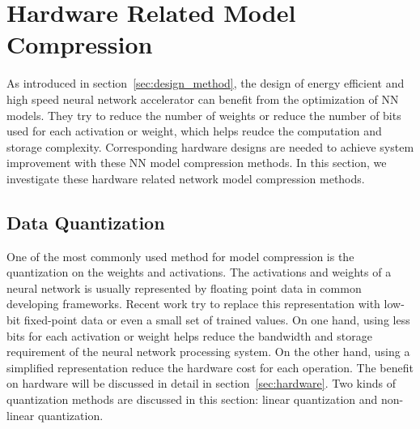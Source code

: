 \section{Hardware Related Model Compression}\label{sec:software}

As introduced in section~\ref{sec:design_method}, the design of energy efficient and high speed neural network accelerator can benefit from the optimization of NN models.  They try to reduce the number of weights or reduce the number of bits used for each activation or weight, which helps reudce the computation and storage complexity. Corresponding hardware designs are needed to achieve system improvement with these NN model compression methods. In this section, we investigate these hardware related network model compression methods.

\subsection{Data Quantization}\label{sec:software:quant}
One of the most commonly used method for model compression is the quantization on the weights and activations. The activations and weights of a neural network is usually represented by floating point data in common developing frameworks. Recent work try to replace this representation with low-bit fixed-point data or even a small set of trained values. On one hand, using less bits for each activation or weight helps reduce the bandwidth and storage requirement of the neural network processing system. On the other hand, using a simplified representation reduce the hardware cost for each operation. The benefit on hardware will be discussed in detail in section~\ref{sec:hardware}. Two kinds of quantization methods are discussed in this section: linear quantization and non-linear quantization.


